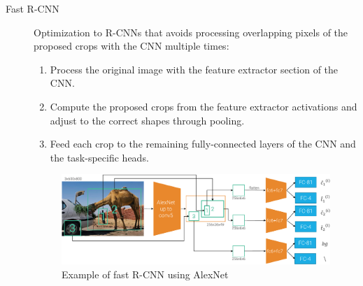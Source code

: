 \begin{description}
    \item[Fast R-CNN] 
        Optimization to R-CNNs that avoids processing overlapping pixels of the proposed crops with the CNN multiple times:
        \begin{enumerate}
            \item Process the original image with the feature extractor section of the CNN.
            \item Compute the proposed crops from the feature extractor activations and adjust to the correct shapes through pooling.
            \item Feed each crop to the remaining fully-connected layers of the CNN and the task-specific heads.
        \end{enumerate}

        \begin{figure}[H]
            \centering
            \includegraphics[width=0.8\linewidth]{./img/_fast_r_cnn.pdf}
            \caption{Example of fast R-CNN using AlexNet}
        \end{figure}


\end{description}
